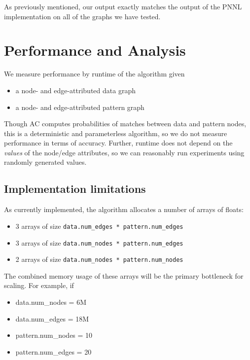 \documentclass[10pt,oneside]{memoir}
\providecommand{\tightlist}{%
  \setlength{\itemsep}{0pt}\setlength{\parskip}{0pt}}
\begin{document}
As previously mentioned, our output exactly matches the output of the
PNNL implementation on all of the graphs we have tested.

\hypertarget{performance-and-analysis}{%
\section{Performance and Analysis}\label{performance-and-analysis}}

We measure performance by runtime of the algorithm given

\begin{itemize}
\tightlist
\item
  a node- and edge-attributed data graph
\item
  a node- and edge-attributed pattern graph
\end{itemize}

Though AC computes probabilities of matches between data and pattern
nodes, this is a deterministic and parameterless algorithm, so we do not
measure performance in terms of accuracy. Further, runtime does not
depend on the \emph{values} of the node/edge attributes, so we can
reasonably run experiments using randomly generated values.

\hypertarget{implementation-limitations}{%
\subsection{Implementation
limitations}\label{implementation-limitations}}

As currently implemented, the algorithm allocates a number of arrays of
floats:

\begin{itemize}
\tightlist
\item
  3 arrays of size \texttt{data.num\_edges\ *\ pattern.num\_edges}
\item
  3 arrays of size \texttt{data.num\_nodes\ *\ pattern.num\_edges}
\item
  2 arrays of size \texttt{data.num\_nodes\ *\ pattern.num\_nodes}
\end{itemize}

The combined memory usage of these arrays will be the primary bottleneck
for scaling. For example, if

\begin{itemize}
\tightlist
\item
  data.num\_nodes = 6M
\item
  data.num\_edges = 18M
\item
  pattern.num\_nodes = 10
\item
  pattern.num\_edges = 20
\end{itemize}
\end{document}
